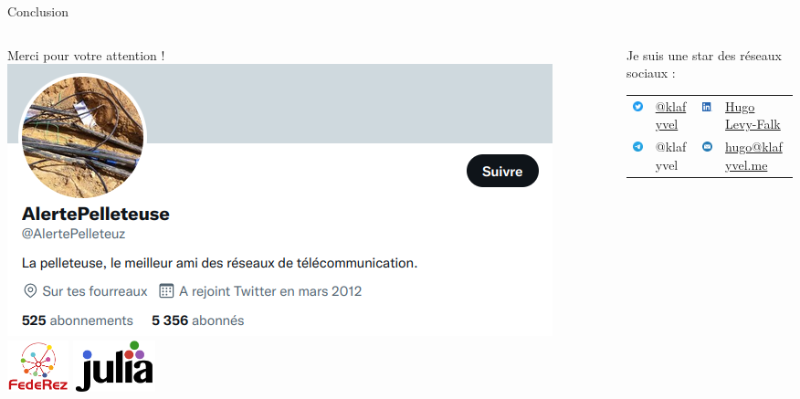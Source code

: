 \documentclass[aspectratio=149, 10pt, t]{beamer}
\begin{document}
\begin{frame}{Conclusion}
    \begin{columns}
        \begin{column}{0.4\linewidth}
            \vspace{0.3cm}
            \medskip
            {\huge Merci pour votre attention !}
            \medskip
            \vspace{1cm}
            \centering
            \includegraphics[width=\linewidth]{images/alerte_pelleteuse}
            \includegraphics[height=1.5cm]{images/federez}
            \includegraphics[height=1.5cm]{images/julia}
        \end{column}
        \begin{column}{0.6\linewidth}
            \centering
            \vspace{0.2cm}
            \alert{Je suis une star des réseaux sociaux :}
            \vspace{0.7cm}
            \begin{tabular}{rl|rl}
                \includegraphics[width=0.5cm]{images/twitter} & \href{https://twitter.com/klafyvel}{@klafyvel} & \includegraphics[width=0.5cm]{images/linkedin} & \href{https://www.linkedin.com/in/hugo-levy-falk/}{Hugo Levy-Falk}\\
                \includegraphics[width=0.5cm]{images/telegram} & @klafyvel & \includegraphics[width=0.5cm]{images/mail} & \href{mailto:hugo@klafyvel.me}{hugo@klafyvel.me}
            \end{tabular}


\end{column}
\end{columns}
\end{frame}
\end{document}
